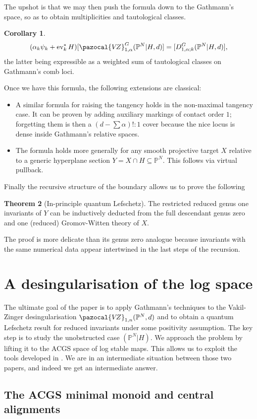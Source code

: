 \documentclass[11pt]{amsart}
\newcommand{\PP}{\mathbb P}
\newcommand{\VZ}{\pazocal{V\!Z}}
\newcommand{\ev}{\operatorname{ev}}
\theoremstyle{definition}
\newtheorem{thm}{Theorem}[section]
\newtheorem{cor}[thm]{Corollary}
\theoremstyle{definition}
\begin{document}
The upshot is that we may then push the formula down to the Gathmann's space, so as to obtain multiplicities and tautological classes.
\begin{cor}
 \[(\alpha_k\psi_k+\ev_k^*H)[\VZ^G_{1,\alpha}(\PP^N|H,d)]=[D^G_{1,\alpha;k}(\PP^N|H,d)],\]
 the latter being expressible as a weighted sum of tautological classes on Gathmann's comb loci.
\end{cor}
Once we have this formula, the following extensions are classical:
\begin{itemize}
 \item A similar formula for raising the tangency holds in the non-maximal tangency case. It can be proven by adding auxiliary markings of contact order $1$; forgetting them is then a $(d-\sum\alpha)!:1$ cover because the nice locus is dense inside Gathmann's relative spaces.
 \item The formula holds more generally for any smooth projective target $X$ relative to a generic hyperplane section $Y=X\cap H\subseteq \PP^N$. This follows via virtual pullback.
\end{itemize}
Finally the recursive structure of the boundary allows us to prove the following
\begin{thm}[In-principle quantum Lefschetz]
 The restricted reduced genus one invariants of $Y$ can be inductively deducted from the full descendant genus zero and one (reduced) Gromov-Witten theory of $X$.
\end{thm}
The proof is more delicate than its genus zero analogue because invariants with the same numerical data appear intertwined in the last steps of the recursion.

\section{A desingularisation of the log space}
The ultimate goal of the paper is to apply Gathmann's techniques to the Vakil-Zinger desingularisation $\VZ_{1,n}(\PP^N,d)$ and to obtain a quantum Lefschetz result for reduced invariants under some positivity assumption. The key step is to study the unobstructed case $(\PP^N|H)$. We approach the problem by lifting it to the ACGS space of log stable maps. This allows us to exploit the tools developed in \cite{RSPW,RSPW2}. We are in an intermediate situation between those two papers, and indeed we get an intermediate answer.

\subsection{The ACGS minimal monoid and central alignments}
\end{document}
